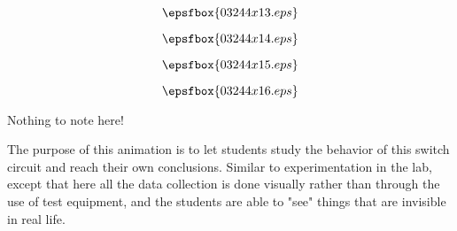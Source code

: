 \vfil \eject
$$\epsfbox{03244x13.eps}$$

\vfil \eject
$$\epsfbox{03244x14.eps}$$

\vfil \eject
$$\epsfbox{03244x15.eps}$$

\vfil \eject
$$\epsfbox{03244x16.eps}$$


\vfil \eject







Nothing to note here!







The purpose of this animation is to let students study the behavior of this switch circuit and reach their own conclusions.  Similar to experimentation in the lab, except that here all the data collection is done visually rather than through the use of test equipment, and the students are able to "see" things that are invisible in real life.





